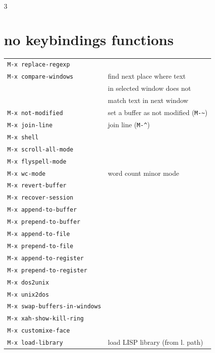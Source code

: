 \documentclass[11pt,landscape,a4paper]{article}
\begin{document}
\begin{multicols}{3}
\columnbreak

\section{no keybindings functions}

\begin{tabular}{@{}ll@{}}
{\verb|M-x replace-regexp|} & \\
\verb|M-x compare-windows|  & find next place where text \\ & in selected window does not\\ &  match text in next window\\
{\verb|M-x not-modified|} & set a buffer as not modified (\verb|M-~|)\\
{\verb|M-x join-line|} & join line (\verb|M-^|)\\ %
{\verb|M-x shell|} & \\
{\verb|M-x scroll-all-mode|} & \\ %
{\verb|M-x flyspell-mode|} & \\
{\color{cgreen}\verb|M-x wc-mode|} & word count minor mode\\
{\verb|M-x revert-buffer|} & \\ %
{\verb|M-x recover-session|} & \\
{\verb|M-x append-to-buffer|} & \\
{\verb|M-x prepend-to-buffer|} & \\
{\verb|M-x append-to-file|} & \\
{\verb|M-x prepend-to-file|} & \\
{\verb|M-x append-to-register|} & \\
{\verb|M-x prepend-to-register|} & \\
{\color{darkred}\verb|M-x dos2unix|} & \\
{\color{darkred}\verb|M-x unix2dos|} & \\
{\color{darkred}\verb|M-x swap-buffers-in-windows|} & \\
{\color{darkred}\verb|M-x xah-show-kill-ring|} & \\
{\verb|M-x customixe-face|} & \\ %
{\verb|M-x load-library|} & load LISP library (from l. path)\\ %

\end{tabular}
\end{multicols}
\end{document}
